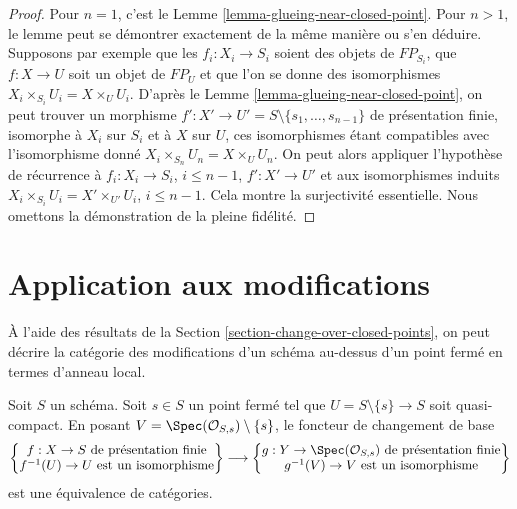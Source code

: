 \begin{proof}
Pour $n = 1$, c'est le Lemme \ref{lemma-glueing-near-closed-point}.
Pour $n > 1$, le lemme peut se démontrer exactement de la même manière ou
s'en déduire. Supposons par exemple que les $f_i : X_i \to S_i$
soient des objets de $FP_{S_i}$, que $f : X \to U$ soit un objet
de $FP_U$ et que l'on se donne des isomorphismes $X_i \times_{S_i} U_i = X \times_U U_i$.
D'après le Lemme \ref{lemma-glueing-near-closed-point}, on peut trouver
un morphisme $f' : X' \to U' = S \setminus \{s_1, \ldots, s_{n - 1}\}$
de présentation finie, isomorphe à
$X_i$ sur $S_i$ et à $X$ sur $U$, ces
isomorphismes étant compatibles avec l'isomorphisme donné
$X_i \times_{S_n} U_n = X \times_U U_n$.
On peut alors appliquer l'hypothèse de récurrence à
$f_i : X_i \to S_i$, $i \leq n - 1$,
$f' : X' \to U'$ et aux isomorphismes
induits $X_i \times_{S_i} U_i = X' \times_{U'} U_i$, $i \leq n - 1$.
Cela montre la surjectivité essentielle. Nous omettons la démonstration de
la pleine fidélité.
\end{proof}






\section{Application aux modifications}
\label{section-modifications-at-a-point}

\noindent
À l'aide des résultats de la Section \ref{section-change-over-closed-points},
on peut décrire la catégorie des modifications d'un
schéma au-dessus d'un point fermé en termes d'anneau local.

\begin{lemma}
\label{lemma-modifications}
Soit $S$ un schéma. Soit $s \in S$ un point fermé tel que
$U = S \setminus \{s\} \to S$ soit quasi-compact. En posant
$V = \Spec(\mathcal{O}_{S, s}) \setminus \{s\}$, le foncteur de changement de base
$$
\left\{
\begin{matrix}
f : X \to S\text{ de présentation finie} \\
f^{-1}(U) \to U\text{ est un isomorphisme}
\end{matrix}
\right\}
\longrightarrow
\left\{
\begin{matrix}
g : Y \to \Spec(\mathcal{O}_{S, s})\text{ de présentation finie} \\
g^{-1}(V) \to V\text{ est un isomorphisme}
\end{matrix}
\right\}
$$
est une équivalence de catégories.
\end{lemma}

